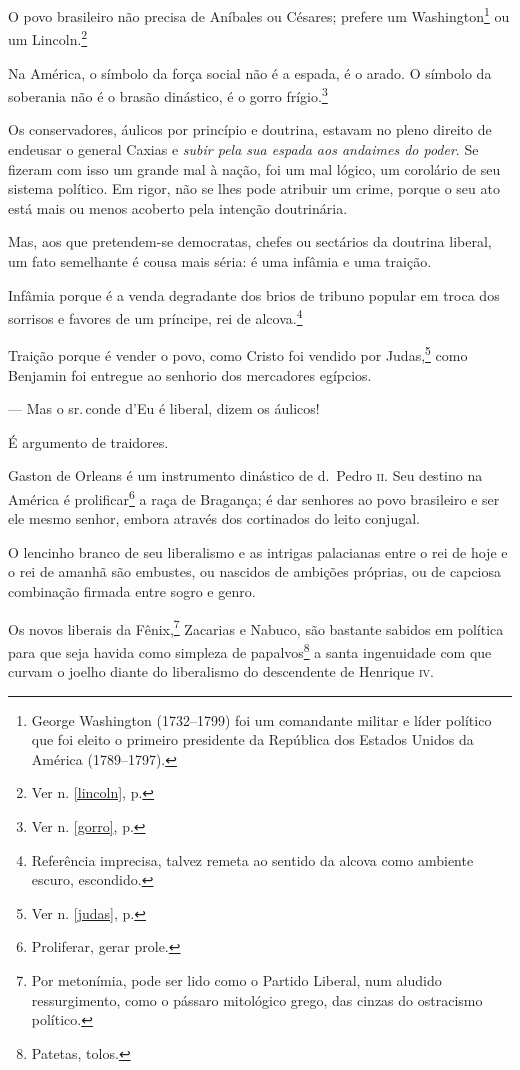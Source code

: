 O povo brasileiro não precisa de Aníbales ou Césares; prefere um
Washington\footnote{George Washington (1732--1799) foi um comandante
  militar e líder político que foi eleito o primeiro presidente da
  República dos Estados Unidos da América (1789--1797).} ou um
Lincoln.\footnote{Ver n. \ref{lincoln}, p. \pageref{lincoln}}

Na América, o símbolo da força social não é a espada, é o arado. O
símbolo da soberania não é o brasão dinástico, é o gorro
frígio.\footnote{Ver n. \ref{gorro}, p. \pageref{gorro}}

Os conservadores, áulicos por princípio e doutrina, estavam no pleno
direito de endeusar o general Caxias e \emph{subir pela sua espada aos
andaimes do poder}. Se fizeram com isso um grande mal à nação, foi um
mal lógico, um corolário de seu sistema político. Em rigor, não se lhes
pode atribuir um crime, porque o seu ato está mais ou menos acoberto
pela intenção doutrinária.

Mas, aos que pretendem-se democratas, chefes ou sectários da doutrina
liberal, um fato semelhante é cousa mais séria: é uma infâmia e uma
traição.

Infâmia porque é a venda degradante dos brios de tribuno popular em
troca dos sorrisos e favores de um príncipe, rei de alcova.\footnote{
  Referência imprecisa, talvez remeta ao sentido da alcova como ambiente
  escuro, escondido.}

Traição porque é vender o povo, como Cristo foi vendido por
Judas,\footnote{Ver n. \ref{judas}, p. \pageref{judas}} como Benjamin foi
entregue ao senhorio dos mercadores egípcios.

--- Mas o sr.\,conde d'Eu é liberal, dizem os áulicos!

É argumento de traidores.

Gaston de Orleans é um instrumento dinástico de d.~Pedro \textsc{ii}. Seu destino
na América é prolificar\footnote{Proliferar, gerar prole.} a raça de
Bragança; é dar senhores ao povo brasileiro e ser ele mesmo senhor,
embora através dos cortinados do leito conjugal.

O lencinho branco de seu liberalismo e as intrigas palacianas entre o
rei de hoje e o rei de amanhã são embustes, ou nascidos de ambições
próprias, ou de capciosa combinação firmada entre sogro e genro.

Os novos liberais da Fênix,\footnote{Por metonímia, pode ser lido como
  o Partido Liberal, num aludido ressurgimento, como o pássaro
  mitológico grego, das cinzas do ostracismo político.} Zacarias e
Nabuco, são bastante sabidos em política para que seja havida como
simpleza de papalvos\footnote{Patetas, tolos.} a santa ingenuidade com
que curvam o joelho diante do liberalismo do descendente de Henrique \textsc{iv}.

